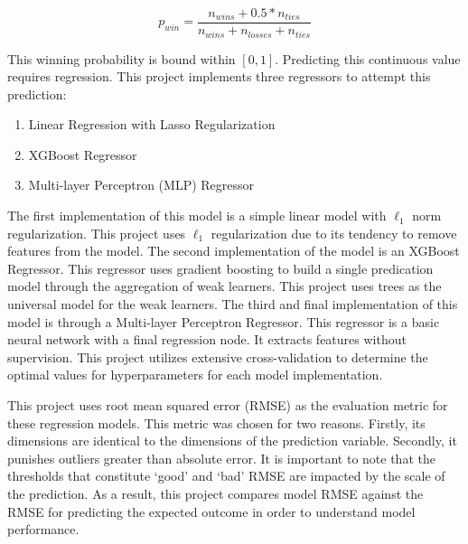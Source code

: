 \documentclass[conference]{IEEEtran}
\begin{document}
\begin{equation}
        p_{win}=\frac{n_{wins} + 0.5*n_{ties}}{n_{wins} + n_{losses} + n_{ties}}
        \label{eq1}
\end{equation}

This winning probability is bound within $[0, 1]$. Predicting this continuous value requires regression. This project implements three regressors to attempt this prediction: 
\begin{enumerate}
  \item Linear Regression with Lasso Regularization\cite{b7}
  \item XGBoost Regressor\cite{b8}
  \item Multi-layer Perceptron (MLP) Regressor\cite{b7}
\end{enumerate}

The first implementation of this model is a simple linear model with $\ell_1$ norm regularization. This project uses $\ell_1$ regularization due to its tendency to remove features from the model. The second implementation of the model is an XGBoost Regressor. This regressor uses gradient boosting to build a single predication model through the aggregation of weak learners. This project uses trees as the universal model for the weak learners. The third and final implementation of this model is through a Multi-layer Perceptron Regressor. This regressor is a basic neural network with a final regression node. It extracts features without supervision. This project utilizes extensive cross-validation to determine the optimal values for hyperparameters for each model implementation. 

This project uses root mean squared error (RMSE) as the evaluation metric for these regression models. This metric was chosen for two reasons. Firstly, its dimensions are identical to the dimensions of the prediction variable. Secondly, it punishes outliers greater than absolute error. It is important to note that the thresholds that constitute `good' and `bad' RMSE are impacted by the scale of the prediction. As a result, this project compares model RMSE against the RMSE for predicting the expected outcome in order to understand model performance. 
\end{document}
